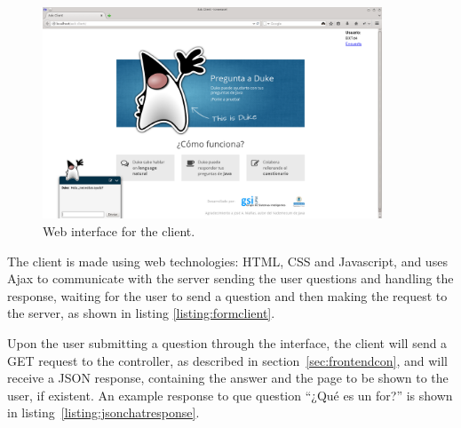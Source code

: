 \begin{figure}[!htbp]
    \centering
    \includegraphics[width=0.9\textwidth]{img/screens/ask-client.png}
    \caption{Web interface for the client.}
    \label{fig:chat1}
\end{figure}

The client is made using web technologies: HTML, CSS and Javascript, and uses Ajax to communicate with the server sending the user questions and handling the response, waiting for the user to send a question and then making the request to the server, as shown in listing \ref{listing:formclient}.


\begin{center}
  
\end{center}

Upon the user submitting a question through the interface, the client will send a GET request to the controller, as described in section~\ref{sec:frontendcon}, and will receive a JSON response, containing the answer and the page to be shown to the user, if existent. An example response to que question ``¿Qué es un for?'' is shown in listing~\ref{listing:jsonchatresponse}.

